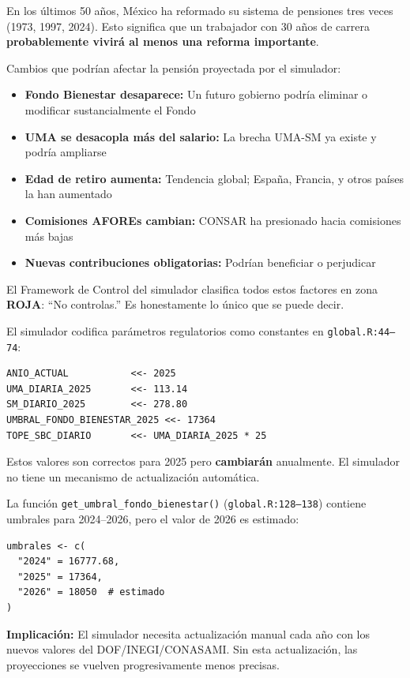 \documentclass[11pt,a4paper]{report}
\begin{document}
\begin{tcolorbox}[colback=green!5!white, colframe=green!50!black, title=\textbf{Intuici\'on: Las Reglas Cambian, y T\'u No Puedes Evitarlo}]
En los \'ultimos 50 a\~nos, M\'exico ha reformado su sistema de pensiones tres veces (1973, 1997, 2024). Esto significa que un trabajador con 30 a\~nos de carrera \textbf{probablemente vivir\'a al menos una reforma importante}.

Cambios que podr\'ian afectar la pensi\'on proyectada por el simulador:
\begin{itemize}
  \item \textbf{Fondo Bienestar desaparece:} Un futuro gobierno podr\'ia eliminar o modificar sustancialmente el Fondo
  \item \textbf{UMA se desacopla m\'as del salario:} La brecha UMA-SM ya existe y podr\'ia ampliarse
  \item \textbf{Edad de retiro aumenta:} Tendencia global; Espa\~na, Francia, y otros pa\'ises la han aumentado
  \item \textbf{Comisiones AFOREs cambian:} CONSAR ha presionado hacia comisiones m\'as bajas
  \item \textbf{Nuevas contribuciones obligatorias:} Podr\'ian beneficiar o perjudicar
\end{itemize}

El Framework de Control del simulador clasifica todos estos factores en zona \textbf{ROJA}: ``No controlas.'' Es honestamente lo \'unico que se puede decir.
\end{tcolorbox}

\begin{tcolorbox}[colback=orange!5!white, colframe=orange!75!black, title=\textbf{Aplicaci\'on en C\'odigo: Constantes que No Son Constantes}]
El simulador codifica par\'ametros regulatorios como constantes en \texttt{global.R:44--74}:

\begin{lstlisting}
ANIO_ACTUAL           <<- 2025
UMA_DIARIA_2025       <<- 113.14
SM_DIARIO_2025        <<- 278.80
UMBRAL_FONDO_BIENESTAR_2025 <<- 17364
TOPE_SBC_DIARIO       <<- UMA_DIARIA_2025 * 25
\end{lstlisting}

Estos valores son correctos para 2025 pero \textbf{cambiar\'an} anualmente. El simulador no tiene un mecanismo de actualizaci\'on autom\'atica.

La funci\'on \texttt{get\_umbral\_fondo\_bienestar()} (\texttt{global.R:128--138}) contiene umbrales para 2024--2026, pero el valor de 2026 es estimado:
\begin{lstlisting}
umbrales <- c(
  "2024" = 16777.68,
  "2025" = 17364,
  "2026" = 18050  # estimado
)
\end{lstlisting}

\textbf{Implicaci\'on:} El simulador necesita actualizaci\'on manual cada a\~no con los nuevos valores del DOF/INEGI/CONASAMI. Sin esta actualizaci\'on, las proyecciones se vuelven progresivamente menos precisas.
\end{tcolorbox}
\end{document}
